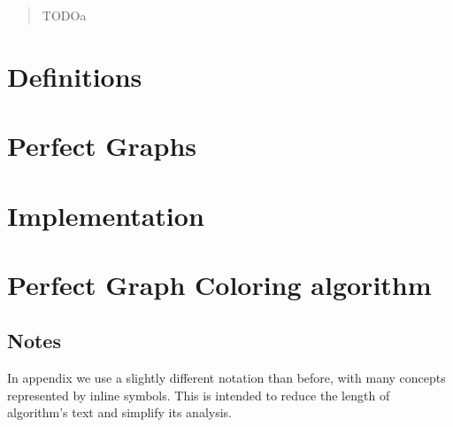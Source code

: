 \documentclass{report}
\author{Adrian Siwiec}
\date{\today{}}
\begin{document}

\pagebreak

\begin{abstract}
	TODOa
\end{abstract}

\listoftheorems[ignoreall,show={defn}]
\tableofcontents

\pagebreak

\chapter*{Definitions}


\chapter{Perfect Graphs}



\chapter{Implementation}


\appendix
\appendixpage
\addappheadtotoc

\chapter{Perfect Graph Coloring algorithm}
\label{ch:coloringSquareFree}
\section{Notes}

In appendix we use a slightly different notation than before, with many concepts represented by inline symbols. This is intended to reduce the length of algorithm's text and simplify its analysis.
\end{document}
